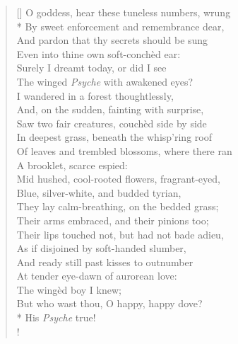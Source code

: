 \documentclass[MAIN]{subfiles}
\begin{document}
\settowidth{\versewidth}{O goddess! hear these tuneless numbers, wrung}
\begin{verse}[\versewidth]
O goddess, hear these tuneless numbers, wrung\\*
\vin By sweet enforcement and remembrance dear,\\
And pardon that thy secrets should be sung\\
\vin Even into thine own soft-conch\`ed ear:\\
Surely I dreamt today, or did I see\\
\vin The winged \emph{Psyche} with awakened eyes?\\
I wandered in a forest thoughtlessly,\\
\vin And, on the sudden, fainting with surprise,\\ 
Saw two fair creatures, couch\`ed side by side\\
\vin In deepest grass, beneath the whisp'ring roof\\
\vin Of leaves and trembled blossoms, where there ran\\
\vin \vin A brooklet, scarce espied:\\
Mid hushed, cool-rooted flowers, fragrant-eyed,\\
\vin Blue, silver-white, and budded tyrian,\\
They lay calm-breathing, on the bedded grass;\\ 
\vin Their arms embraced, and their pinions too;\\
\vin Their lips touched not, but had not bade adieu,\\ 
As if disjoined by soft-handed slumber,\\
And ready still past kisses to outnumber\\
\vin At tender eye-dawn of aurorean love:\\
\vin \vin The wing\`ed boy I knew;\\
\vin But who wast thou, O happy, happy dove?\\*
\vin \vin His \emph{Psyche} true!\\!


\end{verse}
\end{document}
